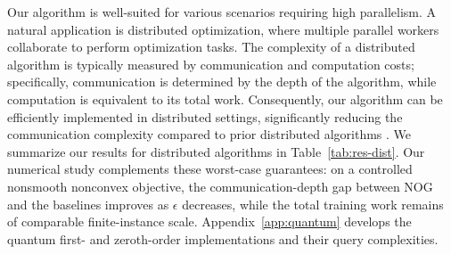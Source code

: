 \documentclass{article}
\def\gO{{\mathcal{O}}}
\theoremstyle{definition}
\theoremstyle{remark}
\begin{document}
	Our algorithm is well-suited for various scenarios requiring high parallelism. A natural application is distributed optimization, where multiple parallel workers collaborate to perform optimization tasks. The complexity of a distributed algorithm is typically measured by communication and computation costs; specifically, communication is determined by the depth of the algorithm, while computation is equivalent to its total work. Consequently, our algorithm can be efficiently implemented in distributed settings, significantly reducing the communication complexity compared to prior distributed algorithms \citep{chen2026decentralized,lin2024decentralized,sahinoglu2024online}. 
	We summarize our results for distributed algorithms in Table~\ref{tab:res-dist}.
	Our numerical study complements these worst-case guarantees: on a controlled nonsmooth nonconvex objective, the communication-depth gap between NOG and the baselines improves as $\epsilon$ decreases, while the total training work remains of comparable finite-instance scale. Appendix~\ref{app:quantum} develops the quantum first- and zeroth-order implementations and their query complexities.
	
	
	
\end{document}
